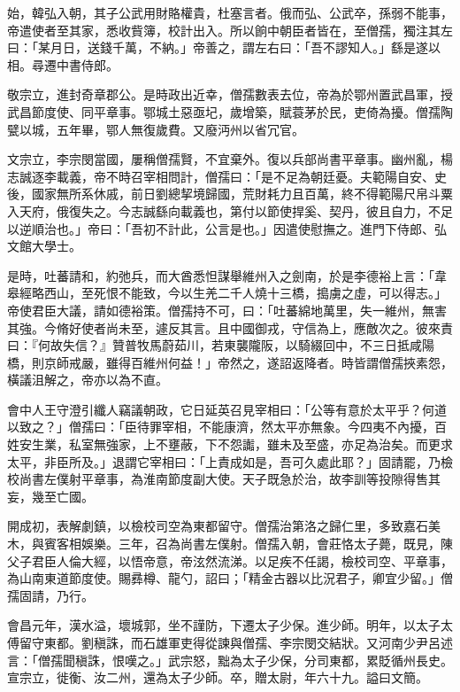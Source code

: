 \begin{pinyinscope}
 始，韓弘入朝，其子公武用財賂權貴，杜塞言者。俄而弘、公武卒，孫弱不能事，帝遣使者至其家，悉收貲簿，校計出入。所以餉中朝臣者皆在，至僧孺，獨注其左曰：「某月日，送錢千萬，不納。」帝善之，謂左右曰：「吾不謬知人。」繇是遂以相。尋遷中書侍郎。



 敬宗立，進封奇章郡公。是時政出近幸，僧孺數表去位，帝為於鄂州置武昌軍，授武昌節度使、同平章事。鄂城土惡亟圮，歲增築，賦蓑茅於民，吏倚為擾。僧孺陶甓以城，五年畢，鄂人無復歲費。又廢沔州以省冗官。



 文宗立，李宗閔當國，屢稱僧孺賢，不宜棄外。復以兵部尚書平章事。幽州亂，楊志誠逐李載義，帝不時召宰相問計，僧孺曰：「是不足為朝廷憂。夫範陽自安、史後，國家無所系休戚，前日劉總挈境歸國，荒財耗力且百萬，終不得範陽尺帛斗粟入天府，俄復失之。今志誠繇向載義也，第付以節使捍奚、契丹，彼且自力，不足以逆順治也。」帝曰：「吾初不計此，公言是也。」因遣使慰撫之。進門下侍郎、弘文館大學士。



 是時，吐蕃請和，約弛兵，而大酋悉怛謀舉維州入之劍南，於是李德裕上言：「韋皋經略西山，至死恨不能致，今以生羌二千人燒十三橋，搗虜之虛，可以得志。」帝使君臣大議，請如德裕策。僧孺持不可，曰：「吐蕃綿地萬里，失一維州，無害其強。今脩好使者尚未至，遽反其言。且中國御戎，守信為上，應敵次之。彼來責曰：『何故失信？』贊普牧馬蔚茹川，若東襲隴阪，以騎綴回中，不三日抵咸陽橋，則京師戒嚴，雖得百維州何益！」帝然之，遂詔返降者。時皆謂僧孺挾素怨，橫議沮解之，帝亦以為不直。



 會中人王守澄引纖人竊議朝政，它日延英召見宰相曰：「公等有意於太平乎？何道以致之？」僧孺曰：「臣待罪宰相，不能康濟，然太平亦無象。今四夷不內擾，百姓安生業，私室無強家，上不壅蔽，下不怨讟，雖未及至盛，亦足為治矣。而更求太平，非臣所及。」退謂它宰相曰：「上責成如是，吾可久處此耶？」固請罷，乃檢校尚書左僕射平章事，為淮南節度副大使。天子既急於治，故李訓等投隙得售其妄，幾至亡國。



 開成初，表解劇鎮，以檢校司空為東都留守。僧孺治第洛之歸仁里，多致嘉石美木，與賓客相娛樂。三年，召為尚書左僕射。僧孺入朝，會莊恪太子薨，既見，陳父子君臣人倫大經，以悟帝意，帝泫然流涕。以足疾不任謁，檢校司空、平章事，為山南東道節度使。賜彞樽、龍勺，詔曰；「精金古器以比況君子，卿宜少留。」僧孺固請，乃行。



 會昌元年，漢水溢，壞城郭，坐不謹防，下遷太子少保。進少師。明年，以太子太傅留守東都。劉稹誅，而石雄軍吏得從諫與僧孺、李宗閔交結狀。又河南少尹呂述言：「僧孺聞稹誅，恨嘆之。」武宗怒，黜為太子少保，分司東都，累貶循州長史。宣宗立，徙衡、汝二州，還為太子少師。卒，贈太尉，年六十九。謚曰文簡。




\end{pinyinscope}
